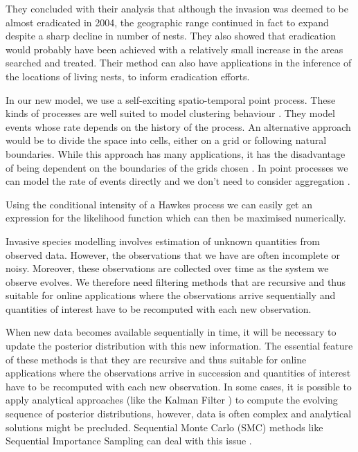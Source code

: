 \documentclass[11pt,a4paper]{article}
\begin{document}
They concluded with their analysis that although the invasion was deemed to be almost eradicated in 2004, the geographic range continued in fact to expand despite a sharp decline in number of nests. They also showed that eradication would probably have been achieved with a relatively small increase in the areas searched and treated. Their method can also have applications in the inference of the locations of living nests, to inform eradication efforts.


In our new model, we use a self-exciting spatio-temporal point process. These kinds of processes are well suited to model clustering behaviour \cite{Reinhart}. They model events whose rate depends on the history of the process. An alternative approach would be to divide the space into cells, either on a grid or following natural boundaries. While this approach has many applications, it has the disadvantage of being dependent on the boundaries of the grids chosen \cite{Fotheringham}. In point processes we can model the rate of events directly and we don't need to consider aggregation \cite{Reinhart}.

Using the conditional intensity of a Hawkes process we can easily get an expression for the likelihood function which can then be maximised numerically.

Invasive species modelling involves estimation of unknown quantities from observed data. However, the observations that we have are often incomplete or noisy. Moreover, these observations are collected over time as the system we observe evolves. We therefore need filtering methods that are recursive and thus suitable for online applications where the observations arrive sequentially and quantities of interest have to be recomputed with each new observation. \cite{Kunsch}

When new data becomes available sequentially in time, it will be necessary to update the posterior distribution with this new information.
The essential feature of these methods is that they are recursive and thus suitable for online applications where the observations arrive in succession and quantities of interest have to be recomputed with each new observation.
In some cases, it is possible to apply analytical approaches (like the Kalman Filter \cite{Kalman}) to compute the evolving sequence of posterior distributions, however, data is often complex and analytical solutions might be precluded.
Sequential Monte Carlo (SMC) methods like Sequential Importance Sampling can deal with this issue \cite{Cappe}.
\end{document}
